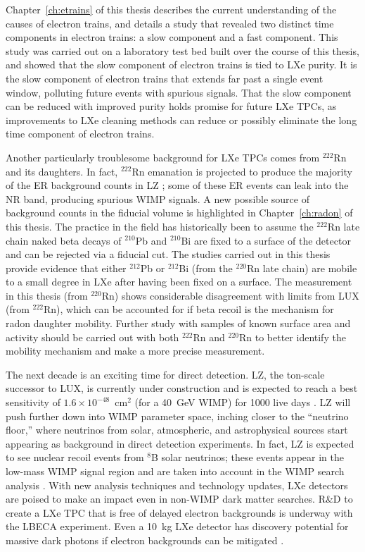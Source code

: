 Chapter~\ref{ch:etrains} of this thesis describes the current understanding of the causes of electron trains, and details a study that revealed two distinct time components in electron trains: a slow component and a fast component. This study was carried out on a laboratory test bed built over the course of this thesis, and showed that the slow component of electron trains is tied to \ac{LXe} purity. It is the slow component of electron trains that extends far past a single event window, polluting future events with spurious signals. That the slow component can be reduced with improved purity holds promise for future \ac{LXe} \ac{TPC}s, as improvements to \ac{LXe} cleaning methods can reduce or possibly eliminate the long time component of electron trains.

Another particularly troublesome background for \ac{LXe} \ac{TPC}s comes from $^{222}$Rn and its daughters. In fact, $^{222}$Rn emanation is projected to produce the majority of the \ac{ER} background counts in \ac{LZ} \cite{LZ:Sensitivity}; some of these \ac{ER} events can leak into the \ac{NR} band, producing spurious \ac{WIMP} signals. A new possible source of background counts in the fiducial volume is highlighted in Chapter~\ref{ch:radon} of this thesis. The practice in the field has historically been to assume the $^{222}$Rn late chain naked beta decays of $^{210}$Pb and $^{210}$Bi are fixed to a surface of the detector and can be rejected via a fiducial cut. The studies carried out in this thesis provide evidence that either $^{212}$Pb or $^{212}$Bi (from the $^{220}$Rn late chain) are mobile to a small degree in \ac{LXe} after having been fixed on a surface. The measurement in this thesis (from $^{220}$Rn) shows considerable disagreement with limits from \ac{LUX} (from $^{222}$Rn), which can be accounted for if beta recoil is the mechanism for radon daughter mobility. Further study with samples of known surface area and activity should be carried out with both $^{222}$Rn and $^{220}$Rn to better identify the mobility mechanism and make a more precise measurement.

The next decade is an exciting time for direct detection. \ac{LZ}, the ton-scale successor to \ac{LUX}, is currently under construction and is expected to reach a best sensitivity of $1.6 \times 10^{-48}$~cm$^{2}$ (for a 40~GeV \ac{WIMP}) for 1000 live days \cite{LZ:Sensitivity}. \ac{LZ} will push further down into \ac{WIMP} parameter space, inching closer to the ``neutrino floor,'' where neutrinos from solar, atmospheric, and astrophysical sources start appearing as background in direct detection experiments. In fact, \ac{LZ} is expected to see nuclear recoil events from $^{8}$B solar neutrinos; these events appear in the low-mass \ac{WIMP} signal region and are taken into account in the \ac{WIMP} search analysis \cite{LZ:Sensitivity}. With new analysis techniques and technology updates, \ac{LXe} detectors are poised to make an impact even in non-\ac{WIMP} dark matter searches. R\&D to create a \ac{LXe} \ac{TPC} that is free of delayed electron backgrounds is underway with the \ac{LBECA} experiment. Even a 10~kg \ac{LXe} detector has discovery potential for massive dark photons if electron backgrounds can be mitigated \cite{cosmicvisions2017}. 

